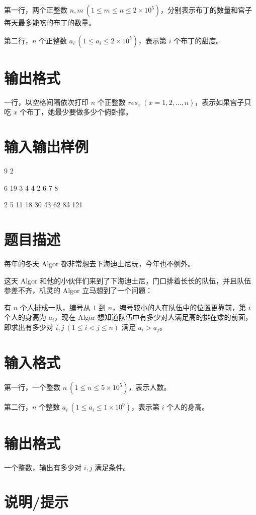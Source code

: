 \documentclass{../cpct/ctpro}
\begin{document}
第一行，两个正整数 $n,m~(1 \leq m \leq n \leq 2 \times {10}^{5})$，分别表示布丁的数量和宫子每天最多能吃的布丁的数量。

第二行，$n$ 个正整数 $a_i~(1 \leq a_i \leq 2 \times {10}^{5})$，表示第 $i$ 个布丁的甜度。

\section*{输出格式}

一行，以空格间隔依次打印 $n$ 个正整数 $res_x~(x=1,2,\dots,n)$，表示如果宫子只吃 $x$ 个布丁，她最少要做多少个俯卧撑。

\section*{输入输出样例}
\testcasetab
{
    9 2\par
    6 19 3 4 4 2 6 7 8
}
{
    2 5 11 18 30 43 62 83 121
}

\makeproblem
\section*{题目描述}

每年的冬天 Algor 都非常想去下海迪土尼玩，今年也不例外。

这天 Algor 和他的小伙伴们来到了下海迪土尼，门口排着长长的队伍，并且队伍参差不齐，机灵的 Algor 立马想到了一个问题：

有 $n$ 个人排成一队，编号从 $1$ 到 $n$，编号较小的人在队伍中的位置更靠前，第 $i$ 个人的身高为 $a_i$，现在 Algor 想知道队伍中有多少对人满足高的排在矮的前面，即求出有多少对 $i,j~(1 \leq i < j \leq n)$ 满足 $a_i > a_j$。

\section*{输入格式}

第一行，一个整数 $n~(1 \leq n \leq 5 \times {10}^{5})$，表示人数。

第二行，$n$ 个整数 $a_i~(1 \leq a_i \leq 1 \times {10}^{9})$，表示第 $i$ 个人的身高。

\section*{输出格式}

一个整数，输出有多少对 $i,j$ 满足条件。

\section*{说明/提示}
\end{document}
